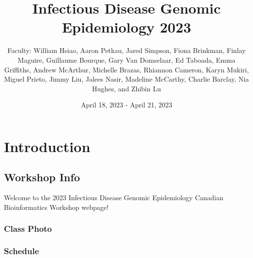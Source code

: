 \documentclass[
]{book}
\title{Infectious Disease Genomic Epidemiology 2023}
\author{Faculty: William Hsiao, Aaron Petkau, Jared Simpson, Fiona Brinkman, Finlay Maguire, Guillaume Bourque, Gary Van Domselaar, Ed Taboada, Emma Griffiths, Andrew McArthur, Michelle Brazas, Rhiannon Cameron, Karyn Mukiri, Miguel Prieto, Jimmy Liu, Jalees Nasir, Madeline McCarthy, Charlie Barclay, Nia Hughes, and Zhibin Lu}
\date{April 18, 2023 - April 21, 2023}
\begin{document}
\maketitle

{
\setcounter{tocdepth}{1}
\tableofcontents
}
\part{Introduction}\label{part-introduction}

\chapter{Workshop Info}\label{workshop-info}

Welcome to the 2023 Infectious Disease Genomic Epidemiology Canadian Bioinformatics Workshop webpage!

\section{Class Photo}\label{class-photo}

\section{Schedule}\label{schedule}
\end{document}

